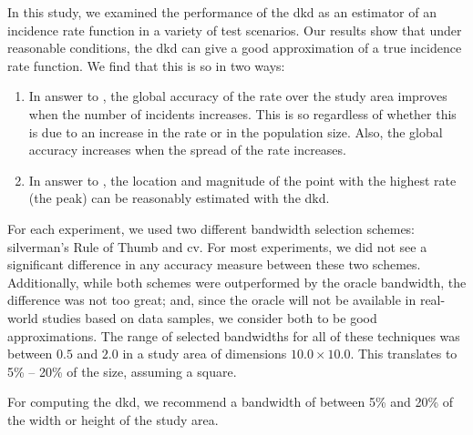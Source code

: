 


In this study,
we examined the performance of the \acrfull{dkd} as an estimator of an incidence rate function in a variety of test scenarios.
Our results show that under reasonable conditions,
the \gls{dkd} can give a good approximation of a true \gls{incidence rate} function.
We find that this is so in two ways:
\begin{enumerate}
    \item In answer to ,
    the global accuracy of the rate over the study area improves when the number of incidents increases.
    This is so regardless of whether this is due to an increase in the rate or in the population size.
    Also, the global accuracy increases when the spread of the rate increases.
    \item In answer to ,
    the location and magnitude of the point with the highest rate (the peak) can be reasonably estimated with the \gls{dkd}.
\end{enumerate}

For each experiment,
we used two different bandwidth selection schemes:
\gls{silverman}'s Rule of Thumb and \acrfull{cv}.
For most experiments,
we did not see a significant difference in any accuracy measure between these two schemes.
Additionally,
while both schemes were outperformed by the \gls{oracle bandwidth},
the difference was not too great;
and, since the \gls{oracle} will not be available in real-world studies based on data samples,
we consider both to be good approximations.
The range of selected bandwidths for all of these techniques was between $0.5$ and $2.0$ in a study area of dimensions $10.0 \times 10.0$.
This translates to 5\% -- 20\% of the size, assuming a square.
\begin{rec}
    \label{rec:bandwidth}
    For computing the \gls{dkd}, we recommend a bandwidth of between 5\% and 20\% of the width or height of the study area.
\end{rec}


